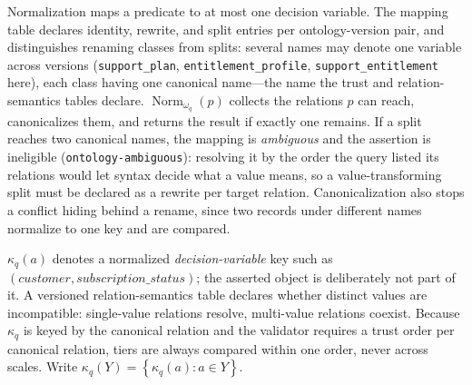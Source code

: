 \documentclass[conference]{IEEEtran}
\newcommand{\reason}[1]{\texttt{#1}}
\newcommand{\set}[1]{\left\{#1\right\}}
\begin{document}
Normalization maps a predicate to at most one decision variable. The mapping table declares identity, rewrite, and split entries per ontology-version pair, and distinguishes renaming classes from splits: several names may denote one variable across versions (\texttt{support\_plan}, \texttt{entitlement\_profile}, \texttt{support\_entitlement} here), each class having one canonical name---the name the trust and relation-semantics tables declare. $\operatorname{Norm}_{\omega_q}(p)$ collects the relations $p$ can reach, canonicalizes them, and returns the result if exactly one remains. If a split reaches two canonical names, the mapping is \emph{ambiguous} and the assertion is ineligible (\reason{ontology-ambiguous}): resolving it by the order the query listed its relations would let syntax decide what a value means, so a value-transforming split must be declared as a rewrite per target relation. Canonicalization also stops a conflict hiding behind a rename, since two records under different names normalize to one key and are compared.

$\kappa_q(a)$ denotes a normalized \emph{decision-variable} key such as $(\mathit{customer},\mathit{subscription\_status})$; the asserted object is deliberately not part of it. A versioned relation-semantics table declares whether distinct values are incompatible: single-value relations resolve, multi-value relations coexist. Because $\kappa_q$ is keyed by the canonical relation and the validator requires a trust order per canonical relation, tiers are always compared within one order, never across scales. Write $\kappa_q(Y)=\set{\kappa_q(a):a\in Y}$.
\end{document}
